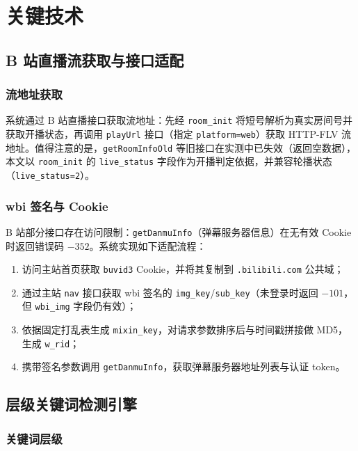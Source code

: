 \documentclass[UTF8,11pt,a4paper]{ctexart}
\begin{document}
\section{关键技术}

\subsection{B 站直播流获取与接口适配}

\subsubsection{流地址获取}

系统通过 B 站直播接口获取流地址：先经 \texttt{room\_init} 将短号解析为真实房间号并获取开播状态，再调用 \texttt{playUrl} 接口（指定 \texttt{platform=web}）获取 HTTP-FLV 流地址。值得注意的是，\texttt{getRoomInfoOld} 等旧接口在实测中已失效（返回空数据），本文以 \texttt{room\_init} 的 \texttt{live\_status} 字段作为开播判定依据，并兼容轮播状态（\texttt{live\_status=2}）。

\subsubsection{wbi 签名与 Cookie}

B 站部分接口存在访问限制：\texttt{getDanmuInfo}（弹幕服务器信息）在无有效 Cookie 时返回错误码 $-352$。系统实现如下适配流程：

\begin{enumerate}
\item 访问主站首页获取 \texttt{buvid3} Cookie，并将其复制到 \texttt{.bilibili.com} 公共域；
\item 通过主站 \texttt{nav} 接口获取 wbi 签名的 \texttt{img\_key}/\texttt{sub\_key}（未登录时返回 $-101$，但 \texttt{wbi\_img} 字段仍有效）；
\item 依据固定打乱表生成 \texttt{mixin\_key}，对请求参数排序后与时间戳拼接做 MD5，生成 \texttt{w\_rid}；
\item 携带签名参数调用 \texttt{getDanmuInfo}，获取弹幕服务器地址列表与认证 token。
\end{enumerate}

\subsection{层级关键词检测引擎}

\subsubsection{关键词层级}
\end{document}
